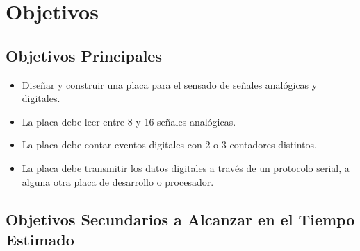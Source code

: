 
\section{Objetivos} %
\label{sec:objetivos}

\subsection{Objetivos Principales} %
\label{sec: objetivos_funcionales}

\begin{itemize}
    \item Diseñar y construir una placa para el sensado de señales analógicas y digitales.
    \item La placa debe leer entre 8 y 16 señales analógicas.
    \item La placa debe contar eventos digitales con 2 o 3 contadores distintos.
    \item La placa debe transmitir los datos digitales a través de un protocolo serial, a alguna otra placa de desarrollo o procesador.
\end{itemize}


\subsection{Objetivos Secundarios a Alcanzar en el Tiempo Estimado} %
\label{sec: objetivos_secundarios}


